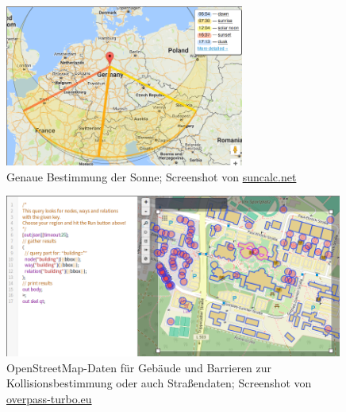 \documentclass[aspectratio=43]{beamer}
\begin{document}
\begin{frame}
    \begin{center}
        \begin{figure}[t]
            \centering
            \includegraphics[width=0.7\textwidth]{bilder/suncalc.png}
            \caption{Genaue Bestimmung der Sonne; Screenshot von \url{suncalc.net}}
        \end{figure}
    \end{center}
\end{frame}

\begin{frame}
    \begin{center}
        \begin{figure}[t]
            \centering
            \includegraphics[width=0.99\textwidth]{bilder/overpass.png}
            \caption{OpenStreetMap-Daten für Gebäude und Barrieren zur
            Kollisionsbestimmung oder auch Straßendaten; Screenshot von
            \url{overpass-turbo.eu}}
        \end{figure}
    \end{center}
\end{frame}
\end{document}
